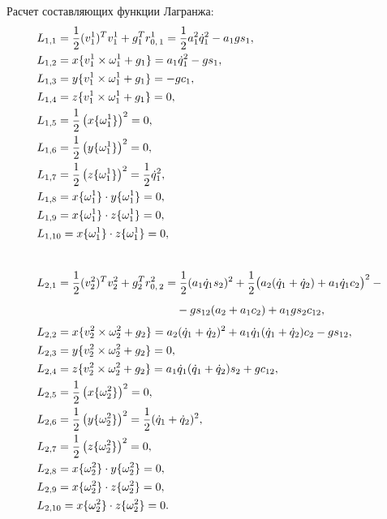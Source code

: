 Расчет составляющих функции Лагранжа:
\begin{align}
    & L_{1,1} = \frac{1}{2} (v^1_1)^T v^1_1 + g_1^T r^1_{0,\,1} = \frac{1}{2} a_1^2 \dot{q}_1^2 - a_1 g s_1,
    \\
    & L_{1,2} = x\{ v^1_1 \times \omega^1_1 + g_1 \} = a_1 \dot{q}_1^2 - g s_1,
    \\
    & L_{1,3} = y\{ v^1_1 \times \omega^1_1 + g_1 \} = -g c_1,
    \\
    & L_{1,4} = z\{ v^1_1 \times \omega^1_1 + g_1 \} = 0,
    \\
    & L_{1,5} = \frac{1}{2} \left( x\{ \omega^1_1 \} \right)^2 = 0,
    \\
    & L_{1,6} = \frac{1}{2} \left( y\{ \omega^1_1 \} \right)^2 = 0,
    \\
    & L_{1,7} = \frac{1}{2} \left( z\{ \omega^1_1 \} \right)^2 = \frac{1}{2} \dot{q}_1^2,
    \\
    & L_{1,8} = x\{ \omega^1_1 \} \cdot y\{ \omega^1_1 \} = 0,
    \\
    & L_{1,9} = x\{ \omega^1_1 \} \cdot z\{ \omega^1_1 \} = 0,
    \\
    & L_{1,10} = x\{ \omega^1_1 \} \cdot z\{ \omega^1_1 \} = 0,
    \\[0.8cm]
    & L_{2,1} = \frac{1}{2} (v^2_2)^T v^2_2 + g_2^T r^2_{0,\,2} = \frac{1}{2} (a_1 \dot{q}_1 s_2)^2 + \frac{1}{2} \bigl( a_2 (\dot{q}_1 + \dot{q}_2) + a_1 \dot{q}_1 c_2 \bigr)^2 - {}
    \\
    &\phantom{L_{2,1} = \frac{1}{2} (v^2_2)^T v^2_2 + g_2^T r^2_{0,\,2} =} {} - g s_{12}(a_2 + a_1 c_2) + a_1 g s_2 c_{12},
    \\
    & L_{2,2} = x\{ v^2_2 \times \omega^2_2 + g_2 \} = a_2 (\dot{q}_1 + \dot{q}_2)^2 + a_1 \dot{q}_1 (\dot{q}_1 + \dot{q}_2) c_2 - g s_{12},
    \\
    & L_{2,3} = y\{ v^2_2 \times \omega^2_2 + g_2 \} = 0,
    \\
    & L_{2,4} = z\{ v^2_2 \times \omega^2_2 + g_2 \} = a_1 \dot{q}_1 (\dot{q}_1 + \dot{q}_2) s_2 + g c_{12},
    \\
    & L_{2,5} = \frac{1}{2} \left( x\{ \omega^2_2 \} \right)^2 = 0,
    \\
    & L_{2,6} = \frac{1}{2} \left( y\{ \omega^2_2 \} \right)^2 = \frac{1}{2} (\dot{q}_1 + \dot{q}_2)^2,
    \\
    & L_{2,7} = \frac{1}{2} \left( z\{ \omega^2_2 \} \right)^2 = 0,
    \\
    & L_{2,8} = x\{ \omega^2_2 \} \cdot y\{ \omega^2_2 \} = 0,
    \\
    & L_{2,9} = x\{ \omega^2_2 \} \cdot z\{ \omega^2_2 \} = 0,
    \\
    & L_{2,10} = x\{ \omega^2_2 \} \cdot z\{ \omega^2_2 \} = 0 \ldotp
\end{align}

